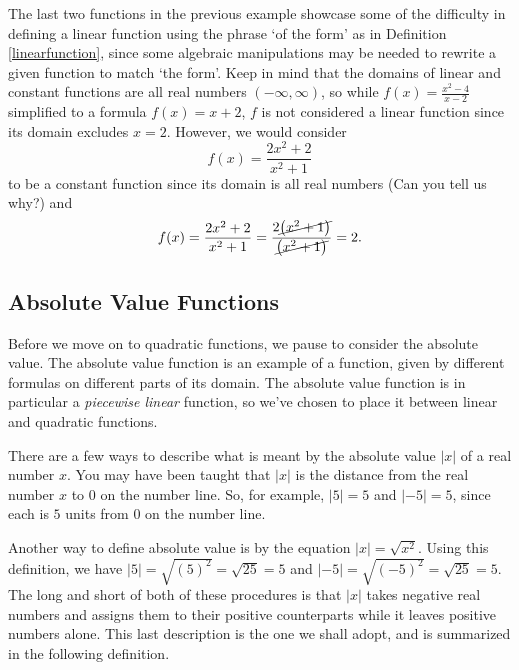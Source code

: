 \medskip


The last two functions in the previous example showcase some of the difficulty in defining a linear function using the phrase `of the form' as in Definition \ref{linearfunction}, since some algebraic manipulations may be needed to rewrite a given function to match `the form'. Keep in mind that the domains of linear and constant functions are all real numbers $(-\infty, \infty)$, so while $f(x) = \frac{x^2-4}{x-2}$ simplified to a formula $f(x) = x+2$, $f$ is not considered a linear function since its domain excludes $x=2$.  However, we would consider \[f(x) = \dfrac{2x^2 + 2}{x^2+1}\] to be a constant function since its domain is all real numbers (Can you tell us why?) and \[ f(x) = \dfrac{2x^2 + 2}{x^2+1} = \dfrac{2\cancel{\left(x^2+1\right)}}{\cancel{\left(x^2+1\right)}} = 2.\]

\newpage

\subsection{Absolute Value Functions}
\label{AbsoluteValueFunctions}
Before we move on to quadratic functions, we pause to consider the absolute value. The absolute value function is an example of a  function, given by different formulas on different parts of its domain. The absolute value function is in particular a \textit{piecewise linear} function, so we've chosen to place it between linear and quadratic functions.

There are a few ways to describe what is meant by the absolute value $|x|$ of a real number $x$.  You may have been taught that $|x|$ is the distance from the real number $x$ to $0$ on the number line.  So, for example, $|5| = 5$ and $|-5| = 5$, since each is $5$ units from $0$ on the number line.

\begin{center}


\end{center}

Another way to define absolute value is by the equation $|x| = \sqrt{x^2}$. Using this definition, we have $|5| = \sqrt{(5)^2} = \sqrt{25} = 5$ and $|-5| = \sqrt{(-5)^2} = \sqrt{25} = 5$.  The long and short of both of these procedures is that $|x|$ takes negative real numbers and assigns them to their positive counterparts while it leaves positive numbers alone.  This last description is the one we shall adopt, and is summarized in the following definition.

